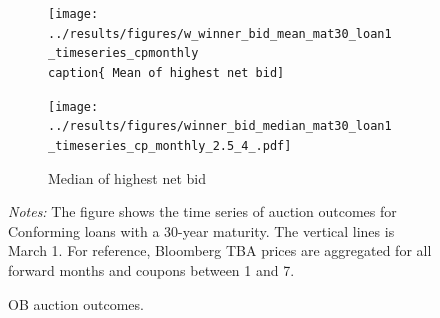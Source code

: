 \documentclass[11pt,a4paper]{article}
\begin{document}
\begin{figure}[h]
\begin{subfigure}[b]{0.49\textwidth}
      \texttt{[image: ../results/figures/w\_winner\_bid\_mean\_mat30\_loan1\_timeseries\_cpmonthly
      \\caption\{ Mean of highest net bid]}
     \end{subfigure}
     \begin{subfigure}[b]{0.49\textwidth}
      \texttt{[image: ../results/figures/winner\_bid\_median\_mat30\_loan1\_timeseries\_cp\_monthly\_2.5\_4\_.pdf]}
      \caption{ Median of highest net bid}
     \end{subfigure}
   \caption{OB auction outcomes. } 
   \begin{minipage}{\textwidth}
      \footnotesize{\textit{Notes:} The figure shows the time series of auction outcomes for Conforming loans with a 30-year maturity.  The vertical lines is March 1. For reference, Bloomberg TBA prices are aggregated for all forward months and coupons between 1 and 7. }
      \end{minipage}
\end{figure}

\pagebreak

\end{document}
